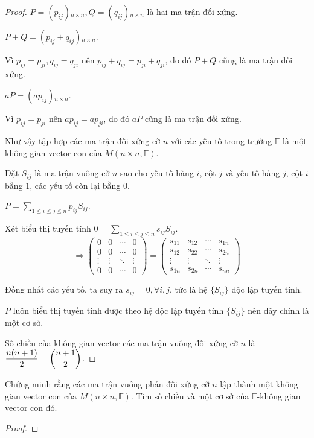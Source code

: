 \documentclass[class=linearalgebra,crop=false]{standalone}
\begin{document}
\begin{proof}$P = (p_{ij}){}_{n\times n}, Q = (q_{ij}){}_{n\times n}$ là hai ma trận đối xứng.
    \par $P + Q = (p_{ij} + q_{ij}){}_{n\times n}$.
    \par Vì $p_{ij} = p_{ji}, q_{ij} = q_{ji}$ nên $p_{ij} + q_{ij} = p_{ji} + q_{ji}$, do đó $P + Q$ cũng là ma trận đối xứng.
    \par $aP = (ap_{ij}){}_{n\times n}$.
    \par Vì $p_{ij} = p_{ji}$ nên $ap_{ij} = ap_{ji}$, do đó $aP$ cũng là ma trận đối xứng.
    \par Như vậy tập hợp các ma trận đối xứng cỡ $n$ với các yếu tố trong trường $\mathbb{F}$ là một không gian vector con của $M(n\times n,\mathbb{F})$.
    \par Đặt $S_{ij}$ là ma trận vuông cỡ $n$ sao cho yếu tố hàng $i$, cột $j$ và yếu tố hàng $j$, cột $i$ bằng $1$, các yếu tố còn lại bằng $0$.
    \par $P = \displaystyle\sum_{1\le i\le j \le n}p_{ij}S_{ij}$.
    \par Xét biểu thị tuyến tính $0 = \displaystyle\sum_{1\le i\le j\le n}s_{ij}S_{ij}$.
    \[
        \Rightarrow
        \begin{pmatrix}
            0 & 0 & \cdots & 0 \\
            0 & 0 & \cdots & 0 \\
            \vdots & \vdots & \ddots & \vdots \\
            0 & 0 & \cdots & 0
        \end{pmatrix} =
        \begin{pmatrix}
            s_{11} & s_{12} & \cdots & s_{1n} \\
            s_{12} & s_{22} & \cdots & s_{2n} \\
            \vdots & \vdots & \ddots & \vdots \\
            s_{1n} & s_{2n} & \cdots & s_{nn}
        \end{pmatrix}
    \]
    \par Đồng nhất các yếu tố, ta suy ra $s_{ij} = 0,\forall i, j$, tức là hệ $\{S_{ij}\}$ độc lập tuyến tính.
    \par $P$ luôn biểu thị tuyến tính được theo hệ độc lập tuyến tính $\{S_{ij}\}$ nên đây chính là một cơ sở.
    \par Số chiều của không gian vector các ma trận vuông đối xứng cỡ $n$ là $\dfrac{n(n + 1)}{2} = \dbinom{n+1}{2}$.
\end{proof}

\begin{exercise}Chứng minh rằng các ma trận vuông phản đối xứng cỡ $n$ lập thành một không gian vector con của $M(n\times n,\mathbb{F})$. Tìm số chiều và một cơ sở của $\mathbb{F}$-không gian vector con đó.
\end{exercise}

\begin{proof}
\end{proof}
\end{document}
